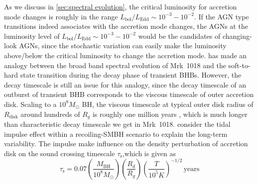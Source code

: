 \documentclass[twocolumn]{aastex63}
\begin{document}
As we discuss in \autoref{sec:spectral evolution}, the critical luminosity for accretion mode changes is roughly in the range $L_\mathrm{bol}/L_\mathrm{Edd}\sim10^{-3}-10^{-2}$. If the AGN type transitions indeed associates with the accretion mode changes, the AGNs at the luminosity level of $L_\mathrm{bol}/L_\mathrm{Edd}\sim10^{-3}-10^{-2}$ would be the candidates of changing-look AGNs, since the stochastic variation can easily make the luminosity above/below the critical luminosity to change the accretion mode. \citet{2018MNRAS.480.3898N} has made an analogy between the broad band spectral evolution of Mrk~1018 and the soft-to-hard state transition during the decay phase of transient BHBs. However, the decay timescale is still an issue for this analogy, since the decay timescale of an outburst of transient BHB corresponds to the viscous timescale of outer accretion disk. Scaling to a $10^{8}M_{\odot}$ BH, the viscous timescale at typical outer disk radius of $R_\mathrm{disk}$ around hundreds of $R_g$ is roughly one million years \citep{2012MmSAI..83..469L,2018MNRAS.475.1190Y}, which is much longer than characteristic decay timescale we get in Mrk~1018.  \citet{2018ApJ...861...51K} consider the tidal impulse effect within a recoiling-SMBH scenario to explain the long-term variability. The impulse make influence on the density perturbation of accretion disk on the sound crossing timescale $\tau_\mathrm{s}$,which is given as
\begin{equation}
\tau_\mathrm{s}= 0.07 (\frac{M_\mathrm{BH}}{10^8M_{\odot}})(\frac{R_d}{R_g}) (\frac{T}{10^5 K})^{-1/2} \, \mathrm{years}
\end{equation}
\end{document}
